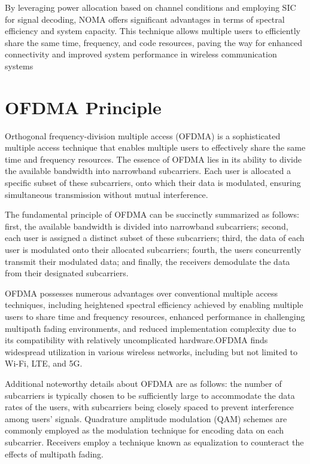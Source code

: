 \documentclass[conference]{IEEEtran}
\begin{document}
By leveraging power allocation based on channel conditions and employing SIC for signal decoding, NOMA offers significant advantages in terms of spectral efficiency and system capacity. This technique allows multiple users to efficiently share the same time, frequency, and code resources, paving the way for enhanced connectivity and improved system performance in wireless communication systems

\section{OFDMA Principle}
Orthogonal frequency-division multiple access (OFDMA) is a sophisticated multiple access technique that enables multiple users to effectively share the same time and frequency resources. The essence of OFDMA lies in its ability to divide the available bandwidth into narrowband subcarriers. Each user is allocated a specific subset of these subcarriers, onto which their data is modulated, ensuring simultaneous transmission without mutual interference.

The fundamental principle of OFDMA can be succinctly summarized as follows: first, the available bandwidth is divided into narrowband subcarriers; second, each user is assigned a distinct subset of these subcarriers; third, the data of each user is modulated onto their allocated subcarriers; fourth, the users concurrently transmit their modulated data; and finally, the receivers demodulate the data from their designated subcarriers.

OFDMA possesses numerous advantages over conventional multiple access techniques, including heightened spectral efficiency achieved by enabling multiple users to share time and frequency resources, enhanced performance in challenging multipath fading environments, and reduced implementation complexity due to its compatibility with relatively uncomplicated hardware.OFDMA finds widespread utilization in various wireless networks, including but not limited to Wi-Fi, LTE, and 5G.

Additional noteworthy details about OFDMA are as follows: the number of subcarriers is typically chosen to be sufficiently large to accommodate the data rates of the users, with subcarriers being closely spaced to prevent interference among users' signals. Quadrature amplitude modulation (QAM) schemes are commonly employed as the modulation technique for encoding data on each subcarrier. Receivers employ a technique known as equalization to counteract the effects of multipath fading.
\end{document}
